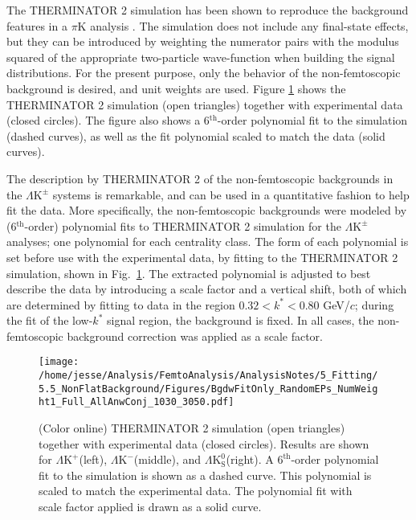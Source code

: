 \documentclass[ALICE,manyauthors]{cernphprep}
\newcommand{\kstar}{$k^{*}$\xspace}
\newcommand{\LamKchP}{$\Lambda\mathrm{K^{+}}$\xspace}
\newcommand{\LamKchM}{$\Lambda\mathrm{K^{-}}$\xspace}
\newcommand{\LamKpm}{$\Lambda\mathrm{K^{\pm}}$\xspace}
\newcommand{\LamKs}{$\Lambda\mathrm{K^{0}_{S}}$\xspace}
\begin{document}
The THERMINATOR 2 simulation has been shown to reproduce the background features in a $\pi$K analysis \cite{Kisiel:2017}. 
The simulation does not include any final-state effects, but they can be introduced by weighting the numerator pairs with the modulus squared of the appropriate two-particle wave-function when building the signal distributions. 
For the present purpose, only the behavior of the non-femtoscopic background is desired, and unit weights are used.
Figure \ref{fig:BgdswTHERM} shows the THERMINATOR 2 simulation (open triangles) together with experimental data (closed circles).  
The figure also shows a 6$^{\mathrm{th}}$-order polynomial fit to the simulation (dashed curves), as well as the fit polynomial scaled to match the data (solid curves).

The description by THERMINATOR 2 of the non-femtoscopic backgrounds in the \LamKpm systems is remarkable, and can be used in a quantitative fashion to help fit the data.
More specifically, the non-femtoscopic backgrounds were modeled by (6$^{\mathrm{th}}$-order) polynomial fits to THERMINATOR 2 simulation for the \LamKpm analyses; one polynomial for each centrality class.
The form of each polynomial is set before use with the experimental data, by fitting to the THERMINATOR 2 simulation, shown in Fig.\ \ref{fig:BgdswTHERM}.
The extracted polynomial is adjusted to best describe the data by introducing a scale factor and a vertical shift, both of which are determined by fitting to data in the region $0.32 < k^{*} < 0.80$ GeV/$c$; during the fit of the low-\kstar signal region, the background is fixed.
In all cases, the non-femtoscopic background correction was applied as a scale factor.

\begin{figure}[h]
  \centering
  \texttt{[image: /home/jesse/Analysis/FemtoAnalysis/AnalysisNotes/5\_Fitting/5.5\_NonFlatBackground/Figures/BgdwFitOnly\_RandomEPs\_NumWeight1\_Full\_AllAnwConj\_1030\_3050.pdf]}
  \caption[Backgrounds with THERMINATOR 2]
  {
  (Color online) THERMINATOR 2 simulation (open triangles) together with experimental data (closed circles).  
  Results are shown for \LamKchP (left), \LamKchM (middle), and \LamKs (right).
  A $6^{\mathrm{th}}$-order polynomial fit to the simulation is shown as a dashed curve.  
  This polynomial is scaled to match the experimental data.  
  The polynomial fit with scale factor applied is drawn as a solid curve.
  }
  \label{fig:BgdswTHERM}
\end{figure} 
\end{document}

